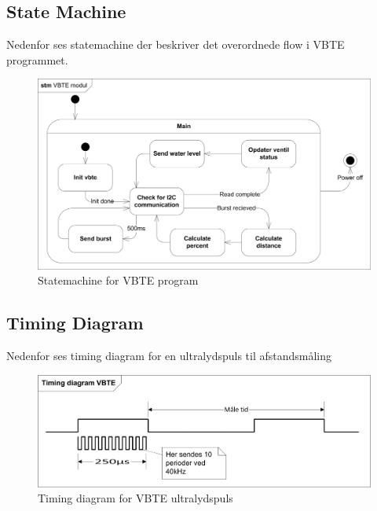 \subsection{State Machine}
Nedenfor ses statemachine der beskriver det overordnede flow i VBTE programmet.
\begin{figure}[H]
\centering
\includegraphics[width=1\textwidth]{billeder/STMVBTE}
\caption{Statemachine for VBTE program}
\end{figure}

\subsection{Timing Diagram}
Nedenfor ses timing diagram for en ultralydspuls til afstandsmåling
\begin{figure}[H]
\centering
\includegraphics[width=1\textwidth]{billeder/TimingdiagramVBTE}
\caption{Timing diagram for VBTE ultralydspuls}
\end{figure}